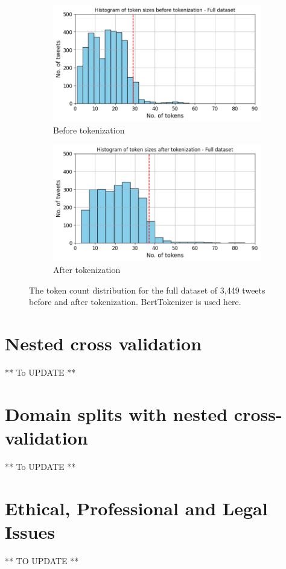 \begin{figure}[htbp]
    \centering
    \captionsetup{font=small}
    \begin{subfigure}[b]{0.48\textwidth}
        \includegraphics[width=\textwidth]{figures/token_hist.png}
        \caption{Before tokenization}
        \label{fig: token_hist}
    \end{subfigure}
    \hfill
    \begin{subfigure}[b]{0.48\textwidth}
        \includegraphics[width=\textwidth]{figures/token_pp_hist.png}
        \caption{After tokenization}
        \label{fig: token_pp_hist}
    \end{subfigure}
    \caption{The token count distribution for the full dataset of 3,449 tweets before and after tokenization. BertTokenizer is used here.}
    \label{fig: bef_aft_token}
\end{figure}


\section{Nested cross validation}
** To UPDATE **

\section{Domain splits with nested cross-validation}
** To UPDATE **

\section{Ethical, Professional and Legal Issues}
** TO UPDATE **
